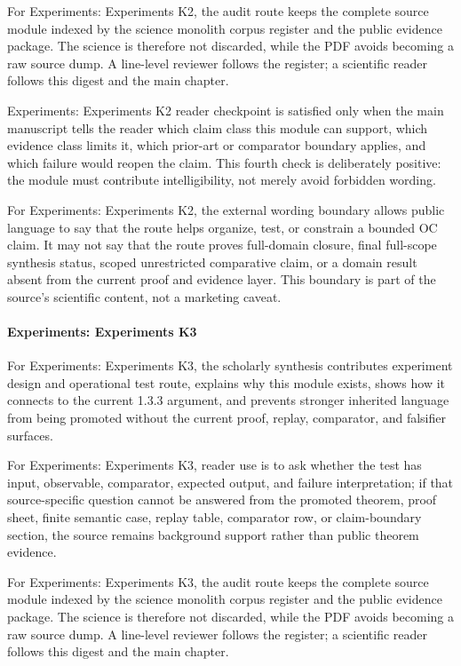 For Experiments: Experiments K2, the audit route keeps the complete source module indexed by the science monolith corpus register and the public evidence package. The science is therefore not discarded, while the PDF avoids becoming a raw source dump. A line-level reviewer follows the register; a scientific reader follows this digest and the main chapter.


Experiments: Experiments K2 reader checkpoint is satisfied only when the main manuscript tells the reader which claim class this module can support, which evidence class limits it, which prior-art or comparator boundary applies, and which failure would reopen the claim. This fourth check is deliberately positive: the module must contribute intelligibility, not merely avoid forbidden wording.


For Experiments: Experiments K2, the external wording boundary allows public language to say that the route helps organize, test, or constrain a bounded OC claim. It may not say that the route proves full-domain closure, final full-scope synthesis status, scoped unrestricted comparative claim, or a domain result absent from the current proof and evidence layer. This boundary is part of the source's scientific content, not a marketing caveat.


\paragraph{Experiments: Experiments K3}

For Experiments: Experiments K3, the scholarly synthesis contributes experiment design and operational test route, explains why this module exists, shows how it connects to the current 1.3.3 argument, and prevents stronger inherited language from being promoted without the current proof, replay, comparator, and falsifier surfaces.


For Experiments: Experiments K3, reader use is to ask whether the test has input, observable, comparator, expected output, and failure interpretation; if that source-specific question cannot be answered from the promoted theorem, proof sheet, finite semantic case, replay table, comparator row, or claim-boundary section, the source remains background support rather than public theorem evidence.


For Experiments: Experiments K3, the audit route keeps the complete source module indexed by the science monolith corpus register and the public evidence package. The science is therefore not discarded, while the PDF avoids becoming a raw source dump. A line-level reviewer follows the register; a scientific reader follows this digest and the main chapter.


